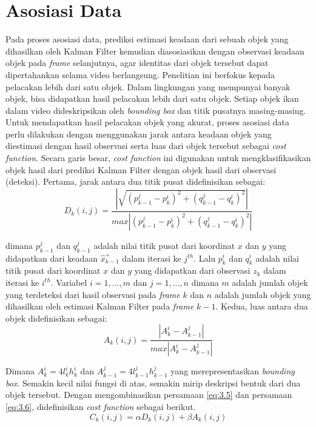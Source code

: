     

\section{Asosiasi Data}
    Pada proses asosiasi data, prediksi estimasi keadaan dari sebuah objek yang dihasilkan oleh Kalman Filter kemudian diasosiasikan dengan observasi keadaan objek pada \textit{frame} selanjutnya, agar identitas dari objek tersebut dapat dipertahankan selama video berlangsung. Penelitian ini berfokus kepada pelacakan lebih dari satu objek. Dalam lingkungan yang mempunyai banyak objek,  bisa didapatkan hasil pelacakan lebih dari satu objek. Setiap objek ikan dalam video dideskripsikan oleh \textit{bounding box} dan titik pusatnya masing-masing. Untuk mendapatkan hasil pelacakan objek yang akurat, proses asosiasi data perlu dilakukan dengan menggunakan jarak antara keadaan objek yang diestimasi dengan hasil observasi serta luas dari objek tersebut sebagai \textit{cost function}. Secara garis besar, \textit{cost function} ini digunakan untuk mengklasifikasikan objek hasil dari prediksi Kalman Filter dengan objek hasil dari observasi (deteksi). Pertama, jarak antara dua titik pusat didefinisikan sebagai: 
    \begin{equation}\label{eq:3.5}
    D_k(i, j) = \frac{|\sqrt{(p_{k-1}^j - p_{k}^i)^2 + (q_{k-1}^j - q_{k}^i)^2}|}{max|(p_{k-1}^j - p_{k}^i)^2 + (q_{k-1}^j - q_{k}^i)^2|}
    \end{equation}
    
    dimana $p_{k-1}^j$ dan $q_{k-1}^j$ adalah nilai titik pusat dari koordinat $x$ dan $y$ yang didapatkan dari keadaan $\hat{x}_{k-1}^+$ dalam iterasi ke $j^{th}$. Lalu $p_{k}^i$ dan $q_{k}^i$ adalah nilai titik pusat dari koordinat $x$ dan $y$ yang didapatkan dari observasi $z_k$ dalam iterasi ke $i^{th}$. Variabel $i = 1, ..., m$ dan $j = 1, ..., n$ dimana $m$ adalah jumlah objek yang terdeteksi dari hasil observasi pada \textit{frame} $k$ dan $n$ adalah jumlah objek yang dihasilkan oleh estimasi Kalman Filter pada \textit{frame} $k-1$. Kedua, luas antara dua objek didefinisikan sebagai:
    \begin{equation}\label{eq:3.6}
    A_k(i, j) = \frac{|A_{k}^i - A_{k-1}^j|}{max|A_{k}^i - A_{k-1}^j|}
    \end{equation}
    
    Dimana $A_{k}^i = 4 l_k^i h_k^i$ dan $A_{k-1}^j = 4 l_{k-1}^j h_{k-1}^j$ yang merepresentasikan \textit{bounding box}. Semakin kecil nilai fungsi di atas, semakin mirip deskripsi bentuk dari dua objek tersebut. Dengan mengombinasikan persamaan \ref{eq:3.5} dan persamaan \ref{eq:3.6}, didefinisikan \textit{cost function} sebagai berikut. 
    \begin{equation}\label{eq:3.7}
    C_k(i, j) = \alpha D_k(i, j) + \beta A_k(i, j)
    \end{equation}
    
